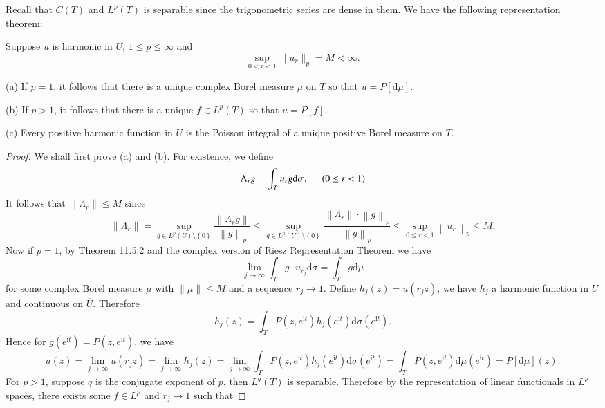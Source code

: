 Recall that $C(T)$ and $L^p(T)$ is separable since the trigonometric series are dense in them. We have the following representation theorem: 
\begin{theorem}
Suppose $u$ is harmonic in $U$, $1\le p\le\infty$ and 
$$\sup_{0<r<1}\|u_r\|_p=M<\infty.$$\par
(a) If $p=1$, it follows that there is a unique complex Borel measure $\mu$ on $T$ so that $u=P[\mathrm{d}\mu]$.\par
(b) If $p>1$, it follows that there is a unique $f\in L^p(T)$ so that $u=P[f]$.\par
(c) Every positive harmonic function in $U$ is the Poisson integral of a unique positive Borel measure on $T$.
\end{theorem}
\begin{proof}
We shall first prove (a) and (b). For existence, we define 
$$
\Lambda _rg=\int_T{u_rg\mathrm{d}\sigma}.\hspace{0.5cm}\left( 0\le r<1 \right) 
$$
It follows that $\|\Lambda_r\|\le M$ since 
$$
\left\| \Lambda _r \right\| =\mathop {\mathrm{sup}} \limits_{g\in L^p\left( U \right) \setminus \left\{ 0 \right\}}\frac{\left\| \Lambda _rg \right\|}{\left\| g \right\| _p}\le \mathop {\mathrm{sup}} \limits_{g\in L^p\left( U \right) \setminus \left\{ 0 \right\}}\frac{\left\| \Lambda _r \right\| \cdot \left\| g \right\| _p}{\left\| g \right\| _p}\le \mathop {\mathrm{sup}} \limits_{0\le r<1}\left\| u_r \right\| _p\le M.
$$
Now if $p=1$, by Theorem 11.5.2 and the complex version of Riesz Representation Theorem we have 
$$
\lim_{j\rightarrow \infty} \int_T{g\cdot u_{r_j}\mathrm{d}\sigma}=\int_T{g\mathrm{d}\mu}
$$
for some complex Borel measure $\mu$ with $\|\mu\|\le M$ and a sequence $r_j\to 1$. Define $h_j(z)=u(r_jz)$, we have $h_j$ a harmonic function in $U$ and continuous on $\overline{U}$. Therefore 
$$
h_j\left( z \right) =\int_T{P\left( z,e^{\mathrm{i}t} \right) h_j\left( e^{\mathrm{i}t} \right) \mathrm{d}\sigma \left( e^{\mathrm{i}t} \right)}.
$$
Hence for $g(e^{\mathrm{i}t})=P(z,e^{\mathrm{i}t})$, we have 
$$
u\left( z \right) =\lim_{j\rightarrow \infty} u\left( r_jz \right) =\lim_{j\rightarrow \infty} h_j\left( z \right) =\lim_{j\rightarrow \infty} \int_T{P\left( z,e^{\mathrm{i}t} \right) h_j\left( e^{\mathrm{i}t} \right) \mathrm{d}\sigma \left( e^{\mathrm{i}t} \right)}=\int_T{P\left( z,e^{\mathrm{i}t} \right) \mathrm{d}\mu \left( e^{\mathrm{i}t} \right)}=P\left[ \mathrm{d}\mu \right] \left( z \right) .
$$
For $p>1$, suppose $q$ is the conjugate exponent of $p$, then $L^q(T)$ is separable. Therefore by the representation of linear functionals in $L^p$ spaces, there exists some $f\in L^p$ and $r_j\to 1$ such that 

\end{proof}

